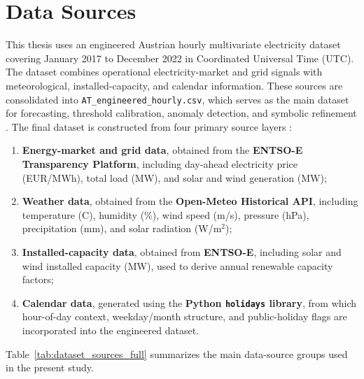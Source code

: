 
\section{Data Sources}
\label{sec:data_sources}

This thesis uses an engineered Austrian hourly multivariate electricity dataset covering January 2017 to December 2022 in Coordinated Universal Time (UTC). The dataset combines operational electricity-market and grid signals with meteorological, installed-capacity, and calendar information. These sources are consolidated into \texttt{AT\_engineered\_hourly.csv}, which serves as the main dataset for forecasting, threshold calibration, anomaly detection, and symbolic refinement \cite{repo_thesis_grid_anomaly}. The final dataset is constructed from four primary source layers \cite{entsoe_transparency,entsoe_installed_capacity,openmeteo_historical,python_holidays}:
\begin{enumerate}
	\item \textbf{Energy-market and grid data}, obtained from the \textbf{ENTSO-E Transparency Platform}, including day-ahead electricity price (EUR/MWh), total load (MW), and solar and wind generation (MW);
	\item \textbf{Weather data}, obtained from the \textbf{Open-Meteo Historical API}, including temperature (\textdegree C), humidity (\%), wind speed (m/s), pressure (hPa), precipitation (mm), and solar radiation (W/m$^2$);
	\item \textbf{Installed-capacity data}, obtained from \textbf{ENTSO-E}, including solar and wind installed capacity (MW), used to derive annual renewable capacity factors;
	\item \textbf{Calendar data}, generated using the \textbf{Python \texttt{holidays} library}, from which hour-of-day context, weekday/month structure, and public-holiday flags are incorporated into the engineered dataset.
\end{enumerate}



Table~\ref{tab:dataset_sources_full} summarizes the main data-source groups used in the present study.

